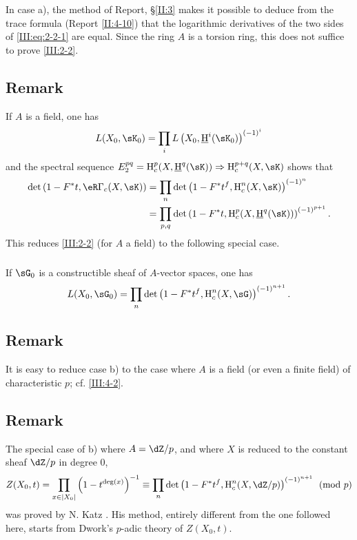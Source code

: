 In case a), the method of Report, \S\ref{II:3} makes it possible to deduce
from the trace formula (Report \ref{II:4-10}) that the logarithmic derivatives
of the two sides of \eqref{III:eq:2-2-1} are equal. Since the ring $A$ is a
torsion ring, this does not suffice to prove \ref{III:2-2}.






\subsection{Remark}\label{III:2-4}

If $A$ is a field, one has
\[
  L(X_0,\sK_0) = \prod_i L\left(X_0,\underline\h^i(\sK_0)\right)^{(-1)^i}
\]
and the spectral sequence
$E_2^{p q} = \h_c^p(X,\underline\h^q(\sK))\Rightarrow \h_c^{p+q}(X,\sK)$ shows
that
\begin{align*}
  \det\left(1-F^* t, \eR\Gamma_c(X,\sK)\right)
    &= \prod_n \det\left(1-F^* t^f,\h_c^n(X,\sK)\right)^{(-1)^n} \\
    &= \prod_{p,q} \det\left(1-F^* t,\h_c^p(X,\underline\h^q(\sK))\right)^{(-1)^{p+1}} \text{.}
\end{align*}
This reduces \ref{III:2-2} (for $A$ a field) to the following special case.


\subsubsection{}\label{III:2-4-1}

If $\sG_0$ is a constructible sheaf of $A$-vector spaces, one has
\[
  L(X_0,\sG_0) = \prod_n \det\left(1-F^* t^f,\h_c^n(X,\sG)\right)^{(-1)^{n+1}} \text{.}
\]






\subsection{Remark}\label{III:2-5}

It is easy to reduce case b) to the case where $A$ is a field (or even a
finite field) of characteristic $p$; cf. \ref{III:4-2}.






\subsection{Remark}\label{III:2-6}

The special case of b) where $A=\dZ/p$, and where $X$ is reduced to the
constant sheaf $\dZ/p$ in degree $0$,
\[
  Z(X_0,t) = \prod_{x\in |X_0|} \left(1-t^{\deg(x)}\right)^{-1}
      \equiv \prod_n \det\left(1-F^* t^f,\h_c^n(X,\dZ/p)\right)^{(-1)^{n+1}} \pmod p
\]
was proved by N. Katz \cite[XXII 3.1]{sga7}. His method, entirely different
from the one followed here, starts from Dwork's $p$-adic theory of
$Z(X_0,t)$.






